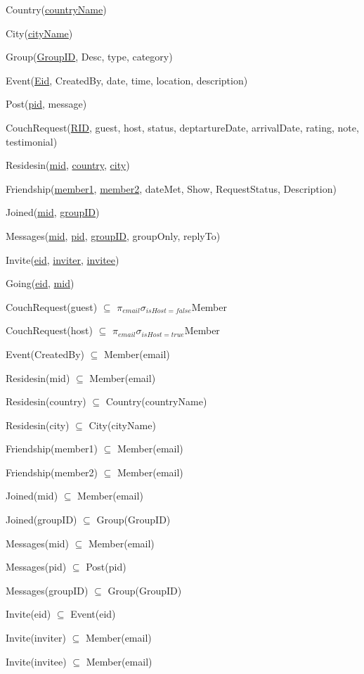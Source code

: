 \documentclass[10pt,a4paper]{article}
\begin{document}
\begin{enumerate}
Country(\underline{countryName})

City(\underline{cityName})

Group(\underline{GroupID}, Desc, type, category)

Event(\underline{Eid}, CreatedBy, date, time, location, description)

Post(\underline{pid}, message)

CouchRequest(\underline{RID}, guest, host, status, deptartureDate, arrivalDate, rating, note, testimonial)

Residesin(\underline{mid}, \underline{country}, \underline{city})

Friendship(\underline{member1}, \underline{member2}, dateMet, Show, RequestStatus, Description)

Joined(\underline{mid}, \underline{groupID})

Messages(\underline{mid}, \underline{pid}, \underline{groupID}, groupOnly, replyTo)

Invite(\underline{eid}, \underline{inviter}, \underline{invitee})

Going(\underline{eid}, \underline{mid})

CouchRequest(guest) $\subseteq$ $\pi_{email}\sigma_{isHost = false}$Member

CouchRequest(host) $\subseteq$ 
$\pi_{email}\sigma_{isHost = true}$Member

Event(CreatedBy) $\subseteq$ Member(email)

Residesin(mid) $\subseteq$ Member(email)

Residesin(country) $\subseteq$ Country(countryName)

Residesin(city) $\subseteq$ City(cityName)

Friendship(member1) $\subseteq$ Member(email)

Friendship(member2) $\subseteq$ Member(email)

Joined(mid) $\subseteq$ Member(email)

Joined(groupID) $\subseteq$ Group(GroupID)

Messages(mid) $\subseteq$ Member(email)

Messages(pid) $\subseteq$ Post(pid)

Messages(groupID) $\subseteq$ Group(GroupID)

Invite(eid) $\subseteq$ Event(eid)

Invite(inviter) $\subseteq$ Member(email)

Invite(invitee) $\subseteq$ Member(email)


\end{enumerate}
\end{document}
